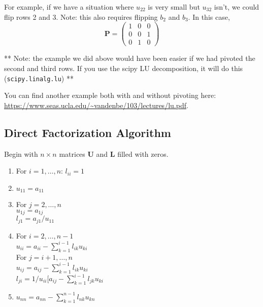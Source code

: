 \documentclass[12pt]{exam}
\newcommand{\ve}[1]{\ensuremath{\mathbf{#1}}}
\begin{document}
For example, if we have a situation where $u_{22}$ is very small but $u_{32}$ isn't, we could flip rows 2 and 3. Note: this also requires flipping $b_2$ and $b_3$. In this case, 
\[\ve{P} = \begin{pmatrix}
  1 & 0 & 0 \\
  0 & 0 & 1 \\
  0 & 1 & 0
\end{pmatrix} \]

** Note: the example we did above would have been easier if we had pivoted the second and third rows. If you use the scipy LU decomposition, it will do this (\texttt{scipy.linalg.lu}) **


You can find another example both with and without pivoting here: \url{https://www.seas.ucla.edu/~vandenbe/103/lectures/lu.pdf}.

\subsection*{Direct Factorization Algorithm}
Begin with $n \times n$ matrices $\ve{U}$ and $\ve{L}$ filled with zeros.
%
\begin{enumerate}
\item For $i = 1, \dots, n$: $l_{ii} = 1$
\item $u_{11} = a_{11}$

\item For $j = 2, \dots, n$\\
  \hspace*{1 em} $u_{1j} = a_{1j}$\\
  \hspace*{1 em} $l_{j1} = a_{j1}/u_{11}$
 
\item For $i = 2, \dots, n-1$\\
  \hspace*{1 em} $u_{ii} = a_{ii} - \sum_{k=1}^{i-1} l_{ik} u_{ki}$\\
  \hspace*{1 em} For $j = i+1, \dots, n$\\   
    \hspace*{3 em} $u_{ij} = a_{ij} - \sum_{k=1}^{i-1} l_{ik} u_{ki}$\\
    \hspace*{3 em} $l_{ji} = 1/u_{ii}[a_{ij} - \sum_{k=1}^{i-1} l_{jk} u_{ki}$
    
\item $u_{nn} = a_{nn} - \sum_{k=1}^{n-1} l_{nk} u_{kn}$
\end{enumerate}
\end{document}
